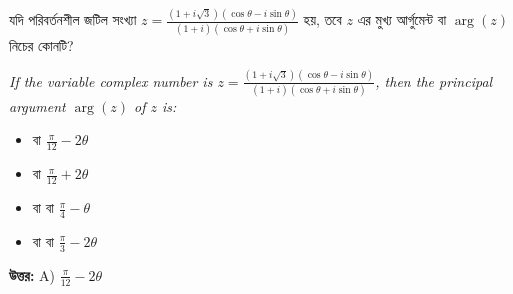 \documentclass[12pt, a4paper]{article}
\begin{document}
\vspace{1em}

\begin{tcolorbox}[questionbox={প্রশ্ন (Question) 24}]
    \noindent
    যদি পরিবর্তনশীল জটিল সংখ্যা $z = \frac{(1+i\sqrt{3})(\cos\theta - i\sin\theta)}{(1+i)(\cos\theta + i\sin\theta)}$ হয়, তবে $z$ এর মুখ্য আর্গুমেন্ট বা $\arg(z)$ নিচের কোনটি?
    
    \vspace{0.8em}
    \begin{english}
    \noindent\textit{\color{darkgray}
    If the variable complex number is $z = \frac{(1+i\sqrt{3})(\cos\theta - i\sin\theta)}{(1+i)(\cos\theta + i\sin\theta)}$, then the principal argument $\arg(z)$ of $z$ is:
    }
    \end{english}
\end{tcolorbox}

\begin{itemize}[label={}, leftmargin=1cm, itemsep=0.5em]
    \item[\textbf{A)}] বা $\frac{\pi}{12} - 2\theta$
    \item[\textbf{B)}] বা $\frac{\pi}{12} + 2\theta$
    \item[\textbf{C)}] বা বা $\frac{\pi}{4} - \theta$
    \item[\textbf{D)}] বা বা $\frac{\pi}{3} - 2\theta$
\end{itemize}

\vspace{0.5em}
\begin{tcolorbox}[answerbox]
    \textbf{\color{success} উত্তর:} A) $\frac{\pi}{12} - 2\theta$
\end{tcolorbox}
\vspace{1em}
\end{document}
